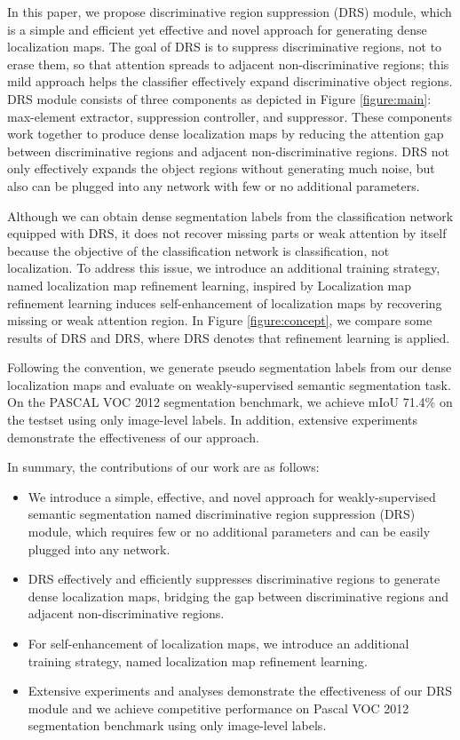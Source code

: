 \documentclass[letterpaper]{article} \usepackage{aaai21}  \usepackage{times}  \usepackage{helvet} \usepackage{courier}  \usepackage[hyphens]{url}  \usepackage{graphicx} \urlstyle{rm} \def\UrlFont{\rm}  \usepackage{natbib}  \usepackage{caption} \frenchspacing  \setlength{\pdfpagewidth}{8.5in}  \setlength{\pdfpageheight}{11in}
\begin{document}
In this paper, we propose discriminative region suppression (DRS) module, which is a simple and efficient yet effective and novel approach for generating dense localization maps.
The goal of DRS is to suppress discriminative regions, not to erase them, so that attention spreads to adjacent non-discriminative regions; this mild approach helps the classifier effectively expand discriminative object regions.
DRS module consists of three components as depicted in Figure \ref{figure:main}: max-element extractor, suppression controller, and suppressor.
These components work together to produce dense localization maps by reducing the attention gap between discriminative regions and adjacent non-discriminative regions.
DRS not only effectively expands the object regions without generating much noise, but also can be plugged into any network with few or no additional parameters.

Although we can obtain dense segmentation labels from the classification network equipped with DRS, it does not recover missing parts or weak attention by itself because the objective of the classification network is classification, not localization.
To address this issue, we introduce an additional training strategy, named localization map refinement learning, inspired by \cite{jiang2019integral}
Localization map refinement learning induces self-enhancement of localization maps by recovering missing or weak attention region.
In Figure \ref{figure:concept}, we compare some results of DRS and DRS, where DRS denotes that refinement learning is applied.

Following the convention, we generate pseudo segmentation labels from our dense localization maps and evaluate on weakly-supervised semantic segmentation task.
On the PASCAL VOC 2012 segmentation benchmark, we achieve mIoU 71.4\% on the testset using only image-level labels.
In addition, extensive experiments demonstrate the effectiveness of our approach.

In summary, the contributions of our work are as follows:
\begin{itemize}
\item We introduce a simple, effective, and novel approach for weakly-supervised semantic segmentation named discriminative region suppression (DRS) module, which requires few or no additional parameters and can be easily plugged into any network.
\item DRS effectively and efficiently suppresses discriminative regions to generate dense localization maps, bridging the gap between discriminative regions and adjacent non-discriminative regions. 
\item For self-enhancement of localization maps, we introduce an additional training strategy, named localization map refinement learning.
\item Extensive experiments and analyses demonstrate the effectiveness of our DRS module and we achieve competitive performance on Pascal VOC 2012 segmentation benchmark using only image-level labels.
\end{itemize}
\end{document}
